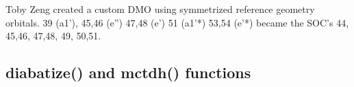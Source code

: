 \documentclass[letterpaper, 12pt, oneside]{report}
\begin{document}



Toby Zeng created a custom DMO using symmetrized reference geometry orbitals. 39 (a1'), 45,46 (e'') 47,48 (e') 51 (a1'*) 53,54 (e'*) became the SOC's 44, 45,46, 47,48, 49, 50,51.


%


\newpage


\subsection{diabatize() and mctdh() functions}
    
\end{document}
